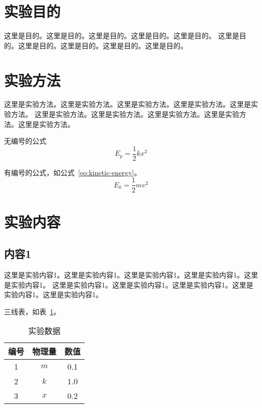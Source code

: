 
\setcounter{page}{1}

\section{实验目的}

这里是目的。这里是目的。这里是目的。这里是目的。这里是目的。
这里是目的。这里是目的。这里是目的。这里是目的。这里是目的。

\section{实验方法}

这里是实验方法。这里是实验方法。这里是实验方法。这里是实验方法。这里是实验方法。
这里是实验方法。这里是实验方法。这里是实验方法。这里是实验方法。这里是实验方法。

无编号的公式
\begin{equation*}
    E_p = \frac{1}{2} k x^2
\end{equation*}

有编号的公式，如公式~\ref{eq:kinetic-energy}。
\begin{equation}
    E_k = \frac{1}{2} m v^2
    \label{eq:kinetic-energy}
\end{equation}


\section{实验内容}

\subsection{内容1}

这里是实验内容1。这里是实验内容1。这里是实验内容1。这里是实验内容1。这里是实验内容1。
这里是实验内容1。这里是实验内容1。这里是实验内容1。这里是实验内容1。这里是实验内容1。

三线表，如表~\ref{tab:exp-data}。

\begin{longtable}[c]{ccc}
    \caption{实验数据}
    \label{tab:exp-data} \\
    \toprule
    \textbf{编号} & \textbf{物理量} & \textbf{数值} \\
    \midrule
    \endhead
    1 & $m$ & 0.1 \\
    2 & $k$ & 1.0 \\
    3 & $x$ & 0.2 \\
    \bottomrule
\end{longtable}



